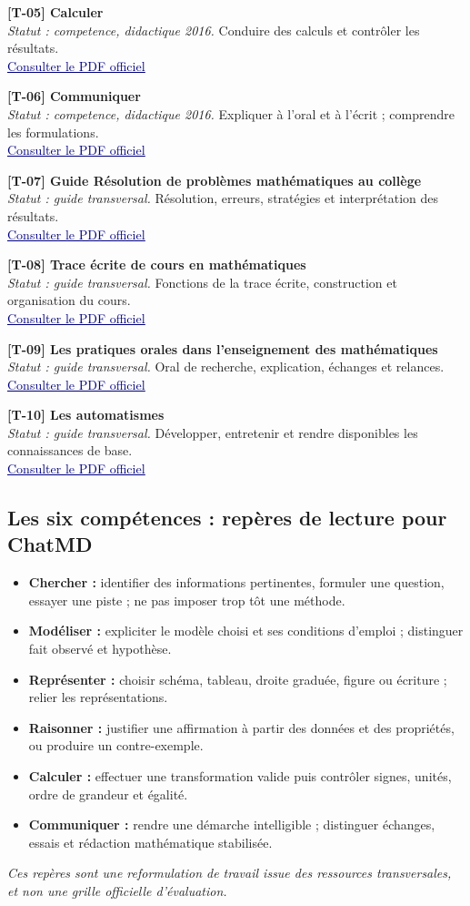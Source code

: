 \documentclass[11pt,a4paper]{article}
\newcommand{\refsource}[1]{\textsf{\textcolor{slate}{[#1]}}}
\newcommand{\entreesource}[5]{\par\noindent\textbf{\refsource{#1} #2}\\[-2pt]\textit{Statut : #3.} #4\\[-2pt]\href{#5}{\textcolor{navy}{\underline{Consulter le PDF officiel}}}\par\smallskip}
\begin{document}
\entreesource{T-05}{Calculer}{competence, didactique 2016}{Conduire des calculs et contrôler les résultats.}{https://eduscol.education.gouv.fr/sites/default/files/document/ra16c4mathcompcalculer554370pdf-77595.pdf}

\entreesource{T-06}{Communiquer}{competence, didactique 2016}{Expliquer à l’oral et à l’écrit ; comprendre les formulations.}{https://eduscol.education.gouv.fr/sites/default/files/document/ra16c4mathcommecritoralpourmontage548548pdf-77598.pdf}

\entreesource{T-07}{Guide Résolution de problèmes mathématiques au collège}{guide transversal}{Résolution, erreurs, stratégies et interprétation des résultats.}{https://eduscol.education.gouv.fr/sites/default/files/document/guide-resolution-de-problemes-mathematiques-au-college-73914.pdf}

\entreesource{T-08}{Trace écrite de cours en mathématiques}{guide transversal}{Fonctions de la trace écrite, construction et organisation du cours.}{https://eduscol.education.gouv.fr/sites/default/files/document/trace-ecrite-de-cours-en-mathspdf-91731.pdf}

\entreesource{T-09}{Les pratiques orales dans l’enseignement des mathématiques}{guide transversal}{Oral de recherche, explication, échanges et relances.}{https://eduscol.education.gouv.fr/sites/default/files/document/les-pratiques-orales-dans-lenseignement-des-mathspdf-91728.pdf}

\entreesource{T-10}{Les automatismes}{guide transversal}{Développer, entretenir et rendre disponibles les connaissances de base.}{https://eduscol.education.gouv.fr/sites/default/files/document/automatismes-mathematiquespdf-91875.pdf}
\subsection{Les six compétences : repères de lecture pour ChatMD}
\begin{itemize}
\item \textbf{Chercher :} identifier des informations pertinentes, formuler une question, essayer une piste ; ne pas imposer trop tôt une méthode.
\item \textbf{Modéliser :} expliciter le modèle choisi et ses conditions d'emploi ; distinguer fait observé et hypothèse.
\item \textbf{Représenter :} choisir schéma, tableau, droite graduée, figure ou écriture ; relier les représentations.
\item \textbf{Raisonner :} justifier une affirmation à partir des données et des propriétés, ou produire un contre-exemple.
\item \textbf{Calculer :} effectuer une transformation valide puis contrôler signes, unités, ordre de grandeur et égalité.
\item \textbf{Communiquer :} rendre une démarche intelligible ; distinguer échanges, essais et rédaction mathématique stabilisée.
\end{itemize}
\textit{Ces repères sont une reformulation de travail issue des ressources transversales, et non une grille officielle d'évaluation.}
\end{document}
